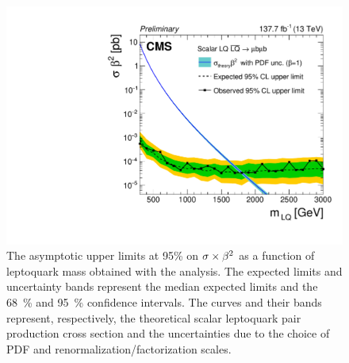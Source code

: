 \begin{figure}[H]
  \centering
  \includegraphics[width=\textwidth]{Images/Analysis/Limits/BR_Sigma_MuMu_Combined.pdf}
  \caption{The asymptotic upper limits at \num{95}{\%} \CL on $\sigma\times\beta^2$ as a function of leptoquark mass obtained with the \mumubj analysis. The expected limits and uncertainty bands represent the median expected limits and the \SI{68}{\%} and \SI{95}{\%} confidence intervals. The  curves and their bands represent, respectively, the theoretical scalar leptoquark pair production cross section and the uncertainties due to the choice of PDF and renormalization/factorization scales.}
  \label{fig:limit_plot_combined}
\end{figure}